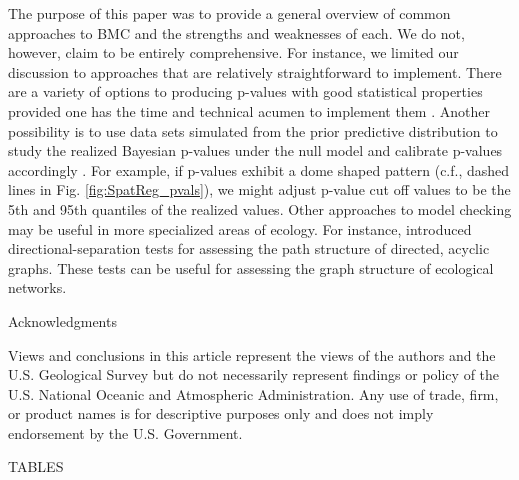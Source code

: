 \documentclass[12pt,english]{article}
\begin{document}
\begin{spacing}{1.9}
    The purpose of this paper was to provide a general overview of
    common approaches to BMC and the strengths and
    weaknesses of each.  We do not, however, claim to be entirely
    comprehensive. For instance, we limited our discussion to
    approaches that are relatively straightforward to implement.
    There are a variety of options to producing p-values with good
    statistical properties provided one has the time and technical
    acumen to implement them \citep[e.g., ``partial posterior" and
    ``conditional predictive" p-values;
    see][]{BayarriBerger1999,RobinsEtAl2000,BayarriCastellanos2007}. Another
    possibility is to use data sets simulated from the prior
    predictive distribution to study the realized Bayesian p-values
    under the null model and calibrate p-values accordingly
    \citep{HjortEtAl2006}.  For example, if p-values exhibit a dome
    shaped pattern (c.f., dashed lines in
    Fig. \ref{fig:SpatReg_pvals}), we might adjust p-value cut off
    values to be the 5th and 95th quantiles of the realized values.
    Other approaches to model checking may be useful in more
    specialized areas of ecology.  For instance, \citet{Shipley2009}
    introduced directional-separation tests for assessing the path
    structure of directed, acyclic graphs.  These tests can be useful
    for assessing the graph structure of ecological networks.


    \centerline{\sc Acknowledgments} Views and conclusions in this
    article represent the views of the authors and the U.S. Geological
    Survey but do not necessarily represent findings or policy of the
    U.S. National Oceanic and Atmospheric Administration.  Any use of
    trade, firm, or product names is for descriptive purposes only and
    does not imply endorsement by the U.S. Government.

    \renewcommand{\refname}{Literature Cited}
    



    \pagebreak




    TABLES


\end{spacing}
\end{document}
